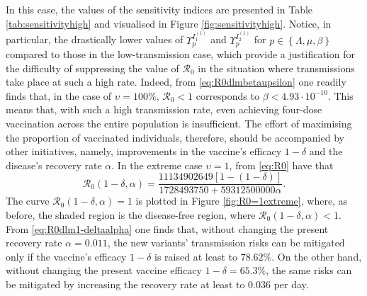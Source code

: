 \documentclass[11pt,reqno]{amsart}
\newcommand{\cR}{\mathcal{R}}
\begin{document}
In this case, the values of the sensitivity indices are presented in Table \ref{tab:sensitivityhigh} and visualised in Figure \ref{fig:sensitivityhigh}. Notice, in particular, the drastically lower values of $\Upsilon_p^{I_1^{(1)}}$ and $\Upsilon_p^{I_2^{(1)}}$ for $p\in\left\{\Lambda,\mu,\beta\right\}$ compared to those in the low-transmission case, which provide a justification for the difficulty of suppressing the value of $\cR_0$ in the situation where transmissions take place at such a high rate. Indeed, from \eqref{eq:R0dlmbetaupsilon} one readily finds that, in the case of $\upsilon=100\%$, $\cR_0<1$ corresponds to $\beta<4.93\cdot 10^{-10}$. This means that, with such a high transmission rate, even achieving four-dose vaccination across the entire population is insufficient. The effort of maximising the proportion of vaccinated individuals, therefore, should be accompanied by other initiatives, namely, improvements in the vaccine's efficacy $1-\delta$ and the disease's recovery rate $\alpha$. In the extreme case $\upsilon=1$, from \eqref{eq:R0} have that
\begin{equation}\label{eq:R0dlm1-deltaalpha}
\cR_0\left(1-\delta,\alpha\right)=\frac{11134902649\left[1-\left(1-\delta\right)\right]}{1728493750+59312500000\alpha}.
\end{equation}
The curve $\cR_0\left(1-\delta,\alpha\right)=1$ is plotted in Figure \ref{fig:R0=1extreme}, where, as before, the shaded region is the disease-free region, where $\cR_0\left(1-\delta,\alpha\right)<1$. From \eqref{eq:R0dlm1-deltaalpha} one finds that, without changing the present recovery rate $\alpha=0.011$, the new variants' transmission risks can be mitigated only if the vaccine's efficacy $1-\delta$ is raised at least to $78.62\%$. On the other hand, without changing the present vaccine efficacy $1-\delta=65.3\%$, the same risks can be mitigated by increasing the recovery rate at least to $0.036$ per day.
\end{document}
